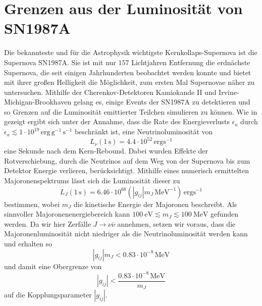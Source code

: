 \section{Grenzen aus der Luminosität von SN1987A}

Die bekannteste und für die Astrophysik wichtigste Kernkollaps-Supernova ist die Supernova SN1987A.
Sie ist mit nur $157$ Lichtjahren Entfernung die erdnächste Supernova, die seit einigen Jahrhunderten beobachtet werden konnte und bietet mit ihrer großen Helligkeit die Möglichkeit, zum ersten Mal Supernovae näher zu untersuchen.
Mithilfe der Cherenkov-Detektoren Kamiokande II und Irvine-Michigan-Brookhaven gelang es, einige Events der SN1987A zu detektieren und so Grenzen auf die Luminosität emittierter Teilchen simulieren zu können.
Wie in \cite{neutrinolumi} gezeigt ergibt sich unter der Annahme, dass die Rate des Energieverlusts $\epsilon_a$ durch $\epsilon_a \lesssim 1 \cdot 10^{19} \,\text{erg} \,\text{g}^{-1} \,\si{\second}^{-1}$ beschränkt ist,
eine Neutrinoluminosität von
\begin{equation}
    L_\nu (1 \,\si{\second}) = \num{4.4} \cdot 10^{52} \,\text{erg} \si{\second}^{-1}
    \label{eq:neutrinolumi}
\end{equation}
eine Sekunde nach dem Kern-Rebound.
Dabei wurden Effekte der Rotverschiebung, durch die Neutrinos auf dem Weg von der Supernova bis zum Detektor Energie verlieren, berücksichtigt.
Mithilfe eines numerisch ermittelten Majoronenspektrums lässt sich die Luminosität dieser zu
\begin{equation}
    L_J (1 \,\si{\second}) = \num{6.46} \cdot 10^{68} \left(|g_{i j}| m_J \,\si{\mega\eV}^{-1} \right) \,\text{erg} \si{\second}^{-1}
\end{equation}
bestimmen, wobei $m_J$ die kinetische Energie der Majoronen beschreibt.
Als sinnvoller Majoronenenergiebereich kann $\SI{100}{\eV} \lesssim m_J \lesssim \SI{100}{\mega\eV}$ gefunden werden.
Da wir hier Zerfälle $J \rightarrow \nu \bar{\nu}$ annehmen, setzen wir voraus, dass die Majoronenluminosität nicht niedriger als die Neutrinoluminosität werden kann und erhalten so
\begin{equation*}
    |g_{i j}| m_J < \num{0.83} \cdot 10^{-8} \,\si{\mega\eV}
\end{equation*}
und damit eine Obergrenze von
\begin{equation}
    |g_{ij}| < \frac{\num{0.83} \cdot 10^{-8} \,\si{\mega\eV}}{m_J}
    \label{eq:gijlimit}
\end{equation}
auf die Kopplungsparameter $|g_{i j}|$.


